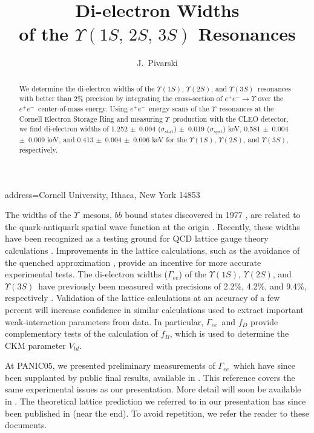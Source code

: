 \documentclass[
    ,final            %
  ]
  {aipproc}
\newcommand{\gee}{$\Gamma_{ee}$}
\newcommand{\ups}{$\Upsilon$}
\newcommand{\us}{$\Upsilon(1S)$}
\newcommand{\uss}{$\Upsilon(2S)$}
\newcommand{\usss}{$\Upsilon(3S)$}
\newcommand{\ee}{$e^+e^-$}
\newcommand{\PM}{$\pm$}
\begin{document}
\title{Di-electron Widths \\ of the \boldmath $\Upsilon(1S,\,2S,\,3S)$ Resonances}


\author{J.~Pivarski}{
  address={Cornell University, Ithaca, New York 14853}
}


\begin{abstract}
We determine the di-electron widths of the \us, \uss, and \usss\
resonances with better than 2\% precision by integrating the
cross-section of $e^+e^- \to \Upsilon$ over the \ee\ center-of-mass
energy.  Using \ee\ energy scans of the \ups\ resonances at the
Cornell Electron Storage Ring and measuring \ups\ production with the
CLEO detector, we find di-electron widths of
%
1.252 \PM\ 0.004 ($\sigma_{\mbox{stat}}$) \PM\ 0.019 ($\sigma_{\mbox{syst}}$) keV,
0.581 \PM\ 0.004 \PM\ 0.009 keV, and
0.413 \PM\ 0.004 \PM\ 0.006 keV for the \us, \uss, and \usss,
respectively.
\end{abstract}

\maketitle


The widths of the \ups\ mesons, $b\bar{b}$ bound states discovered in
1977 \cite{discovery}, are related to the quark-antiquark spatial wave
function at the origin \cite{wavefunction}.  Recently, these widths
have been recognized as a testing ground for QCD lattice gauge theory
calculations \cite{lattice}.  Improvements in the lattice
calculations, such as the avoidance of the quenched approximation
\cite{unquenched}, provide an incentive for more accurate experimental
tests.  The di-electron widths (\gee) of the \us, \uss, and \usss\
have previously been measured with precisions of 2.2\%, 4.2\%, and
9.4\%, respectively \cite{pdg}.  Validation of the lattice
calculations at an accuracy of a few percent will increase confidence
in similar calculations used to extract important weak-interaction
parameters from data.  In particular, \gee\ and $f_D$ \cite{fd}
provide complementary tests of the calculation of $f_B$, which is used
to determine the CKM parameter $V_{td}$.

At PANIC05, we presented preliminary measurements of \gee\ which have
since been supplanted by public final results, available in
\cite{prl}.  This reference covers the same experimental issues as our
presentation.  More detail will soon be available in
\cite{thesis}.  The theoretical lattice prediction we referred to in
our presentation has since been published in
\cite{lattice} (near the end).  To avoid repetition, we refer the reader to these documents.
\end{document}

